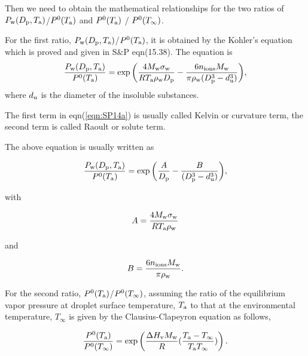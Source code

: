 \documentclass[12pt]{article}
\begin{document}
Then we need to obtain the mathematical relationships for the two ratios of $P_{\rm w}(D_{\rm p}, T_{\rm a})$/$P^{\rm 0}(T_{\rm a})$ and $P^{\rm 0}(T_{\rm a})$ / $P^{\rm 0}(T_{\infty})$. 


For the first ratio, $P_{\rm w}(D_{\rm p}, T_{\rm a})$/$P^{\rm 0}(T_{\rm a})$, it is obtained by the Kohler's equation which is proved and given in S$\&$P eqn(15.38). The equation is 
\begin{equation}\label{eqn:SP14a}
 \frac{P_{\rm w}(D_{\rm p}, T_{\rm a})}{P^{\rm 0}(T_{\rm a})}=\exp{\left(\frac{4M_{\rm w} \sigma_{\rm w}}{RT_{\rm a}\rho_{\rm w}D_{\rm p}}-\frac{6n_{\rm ions}M_{\rm w}}{\pi \rho_{\rm w}(D_{\rm p}^{3}-d_{\rm u}^{3})}\right)},
\end{equation} 
where $d_{\rm u}$ is the diameter of the insoluble substances.

The first term in eqn(\ref{eqn:SP14a}) is usually called Kelvin or curvature term, the second term is called Raoult or solute term.

The above equation is usually written as 

\begin{equation}\label{eqn:SP14b}
\frac{P_{\rm w}(D_{\rm p}, T_{\rm a})}{P^{\rm 0}(T_{\rm a})}=\exp{\left(\frac{A}{D_{\rm p}}-\frac{B}{(D_{\rm p}^{3}-d_{\rm u}^{3})}\right)},
\end{equation} 

with 

\begin{equation}\label{eqn:SP14c}
A=\frac{4 M_{\rm w}\sigma_{\rm w}} {R T_{\rm a} \rho_{\rm w}}
\end{equation}

and 

\begin{equation}\label{eqn:SP14d}
B=\frac{6 n_{\rm ions} M_{\rm w}}{\pi \rho_{\rm w}}.
\end{equation}


For the second ratio, $P^{\rm 0}(T_{\rm a})$/$P^{\rm 0}(T_{\infty})$, assuming the ratio of the equilibrium vapor pressure at droplet surface temperature, $T_{\rm a}$ to that at the environmental temperature, $T_{\infty}$ is given by the Clausius-Clapeyron equation as follows,

\begin{equation}\label{eqn:SP15}
\frac{P^{\rm 0}(T_{\rm a})}{P^{\rm 0}(T_{\infty})}=\exp \left(\frac{\Delta H_{\rm v} M_{\rm w}}{R} (\frac{T_{\rm a}-T_{\infty}}{T_{\rm a} T_{\infty}})\right).
\end{equation}
\end{document}
